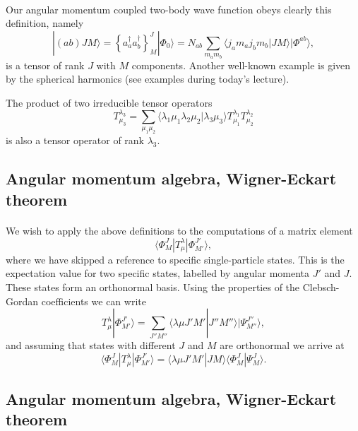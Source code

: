 \documentclass[%
twoside,                 %
final,                   %
10pt]{article}
\begin{document}
\paragraph{}
Our angular momentum coupled two-body wave function obeys clearly this definition, namely
\[
|(ab)JM\rangle  = \left\{a^{\dagger}_aa^{\dagger}_b\right\}^J_M|\Phi_0\rangle=N_{ab}\sum_{m_am_b}\langle j_am_aj_bm_b|JM\rangle|\Phi^{ab}\rangle, 
\]
is a tensor of rank $J$ with $M$ components. Another well-known example is given by the spherical harmonics (see examples during today's lecture). 

The product of two irreducible tensor operators
\[
T^{\lambda_3}_{\mu_3}=\sum_{\mu_1\mu_2}\langle \lambda_1\mu_1\lambda_2\mu_2|\lambda_3\mu_3\rangle T^{\lambda_1}_{\mu_1}T^{\lambda_2}_{\mu_2}
\] 
is also a tensor operator of rank $\lambda_3$.




\subsection*{Angular momentum algebra, Wigner-Eckart theorem}

\paragraph{}
We wish to apply the above definitions to the computations of a matrix element
\[
\langle \Phi^J_M|T^{\lambda}_{\mu}|\Phi^{J'}_{M'}\rangle,
\]
where we have skipped a reference to specific single-particle states. This is the expectation value for two specific states, labelled by angular momenta $J'$ and $J$. These states form an orthonormal basis.
Using the properties of the Clebsch-Gordan coefficients we can write 
\[
T^{\lambda}_{\mu}|\Phi^{J'}_{M'}\rangle=\sum_{J''M''}\langle \lambda \mu J'M'|J''M''\rangle|\Psi^{J''}_{M''}\rangle,
\]
and assuming that states with different $J$ and $M$ are orthonormal we arrive at
\[
\langle \Phi^J_M|T^{\lambda}_{\mu}|\Phi^{J'}_{M'}\rangle= \langle \lambda \mu J'M'|JM\rangle \langle \Phi^J_M|\Psi^{J}_{M}\rangle.
\]



\subsection*{Angular momentum algebra, Wigner-Eckart theorem}
\end{document}
